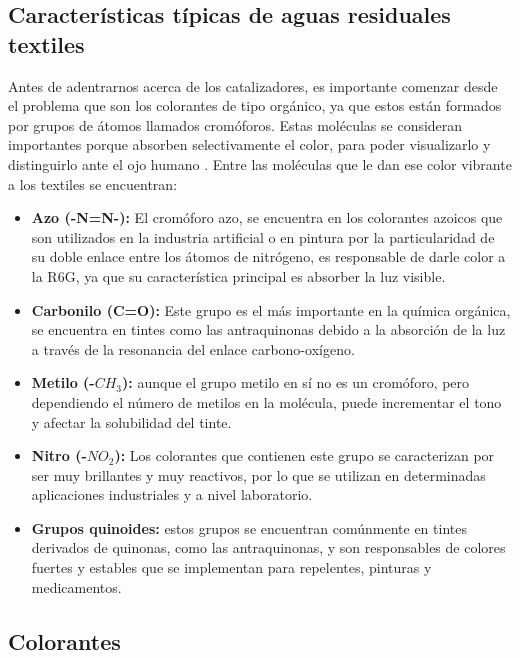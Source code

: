 \documentclass[12pt]{article}
\begin{document}
 \subsection{Características típicas de aguas residuales textiles}    
 Antes de adentrarnos acerca de los catalizadores, es importante comenzar desde el problema que son los colorantes de tipo orgánico, ya que estos están formados por grupos de átomos llamados cromóforos. Estas moléculas se consideran importantes porque absorben selectivamente el color, para poder visualizarlo y distinguirlo ante el ojo humano \cite{Cromoforos}. Entre las moléculas que le dan ese color vibrante a los textiles se encuentran:\vspace{1em} %

\begin{itemize}
\item \textbf{Azo (-N=N-): } El cromóforo azo, se encuentra en los colorantes azoicos que son utilizados en la industria artificial o en pintura por la particularidad de su doble enlace entre los átomos de nitrógeno, es responsable de darle color a la R6G, ya que su característica principal es absorber la luz visible.
\item \textbf{Carbonilo (C=O): }Este grupo es el más importante en la química orgánica, se encuentra en tintes como las antraquinonas debido a la absorción de la luz a través de la resonancia del enlace carbono-oxígeno.
\item \textbf{Metilo (-$\displaystyle CH_{3}$):} aunque el grupo metilo en sí no es un cromóforo, pero dependiendo el número de metilos en la molécula, puede incrementar el tono y afectar la solubilidad del tinte.
\item \textbf{Nitro (-$\displaystyle NO_{2}$):} Los colorantes que contienen este grupo se caracterizan por ser muy brillantes y muy reactivos, por lo que se utilizan en determinadas aplicaciones industriales y a nivel laboratorio.
\item \textbf{Grupos quinoides:} estos grupos se encuentran comúnmente en tintes derivados de quinonas, como las antraquinonas, y son responsables de colores fuertes y estables que se implementan para repelentes, pinturas y medicamentos.
\end{itemize}
 
 \subsection{Colorantes}
\end{document}
